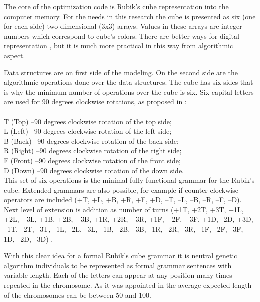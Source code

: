 \documentclass[runningheads]{llncs}
\begin{document}
The core of the optimization code is Rubik's cube representation into the computer memory. For the needs in this research the cube is presented as six (one for each side) two-dimensional (3x3) arrays. Values in these arrays are integer numbers which correspond to cube's colors. There are better ways for digital representation \cite{korf01}, but it is much more practical in this way from algorithmic aspect. 

Data structures are on first side of the modeling. On the second side are the algorithmic operations done over the data structures. The cube has six sides that is why the minimum number of operations over the cube is six. Six capital letters are used for 90 degrees clockwise rotations, as proposed in \cite{randall01,balabanov02}: \\ 
\\
T (Top) –90 degrees clockwise rotation of the top side; \\ 
L (Left) –90 degrees clockwise rotation of the left side; \\ 
B (Back) –90 degrees clockwise rotation of the back side; \\ 
R (Right) –90 degrees clockwise rotation of the right side; \\ 
F (Front) –90 degrees clockwise rotation of the front side; \\ 
D (Down) –90 degrees clockwise rotation of the down side. \\ 

This set of six operations is the minimal fully functional grammar for the Rubik's cube. Extended grammars are also possible, for example if counter-clockwise operators are included (+T, +L, +B, +R, +F, +D, –T, –L, –B, –R, –F, –D). Next level of extension is addition as number of turns (+1T, +2T, +3T, +1L, +2L, +3L, +1B, +2B, +3B, +1R, +2R, +3R, +1F, +2F, +3F, +1D,+2D, +3D, –1T, –2T, –3T, –1L, –2L, –3L, –1B, –2B, –3B, –1R, –2R, –3R, –1F, –2F, –3F, –1D, –2D, –3D) \cite{balabanov02}.

With this clear idea for a formal Rubik's cube grammar it is neutral genetic algorithm individuals to be represented as formal grammar sentences with variable length. Each of the letters can appear at any position many times repeated in the chromosome. As it was appointed in \cite{korf01} the average expected length of the chromosomes can be between 50 and 100.
\end{document}
